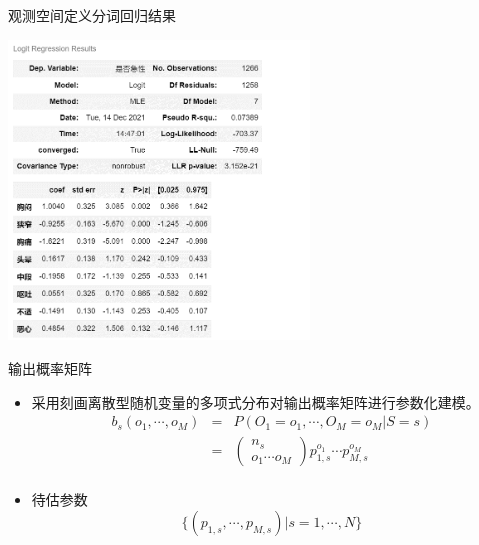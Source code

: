 \documentclass{beamer}
\newcommand{\nb}{\nonumber}
\begin{document}
\begin{frame}{观测空间定义}{分词回归结果}
    \begin{center}
\includegraphics[width=0.6\textwidth]{分词回归.png}\\
\end{center}
\end{frame}

\begin{frame}{输出概率矩阵}

\begin{itemize}
\item
采用刻画离散型随机变量的多项式分布对输出概率矩阵进行参数化建模。
\begin{eqnarray*}
b_s(o_1,\cdots, o_M)
&=& P(O_1=o_1,\cdots,O_M=o_M|S=s) \nb \\
&=&
\left(\begin{array}{c}
n_s \\
o_{1} \cdots o_{M}
\end{array}\right) p_{1,s}^{o_{1}} \cdots p_{M,s}^{o_{M}}\nb\\
\end{eqnarray*}

\item
待估参数
$$\{(p_{1,s},\cdots,p_{M,s})|s=1,\cdots,N\}$$

\end{itemize}
 
\end{frame}
\end{document}
